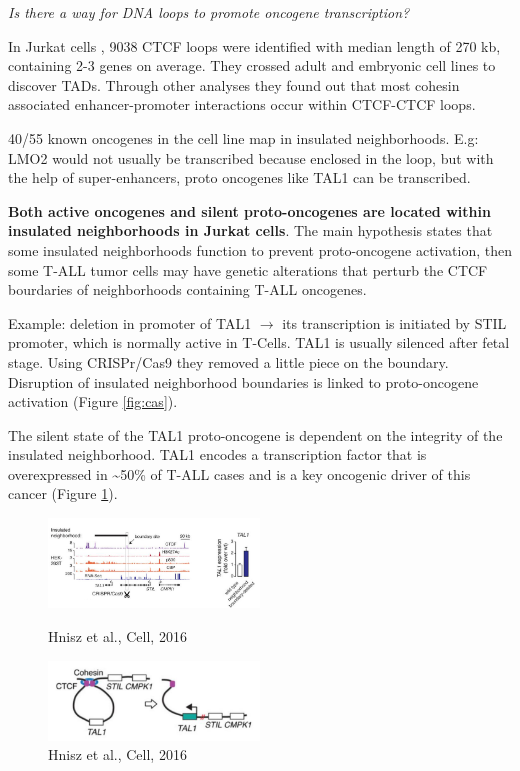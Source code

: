 \emph{Is there a way for DNA loops to promote oncogene transcription?}

In Jurkat cells , 9038 CTCF loops were identified with median length of 270 kb, containing 2-3 genes on average. They crossed adult and embryonic cell lines to discover TADs. Through other analyses they found out that most cohesin associated enhancer-promoter interactions occur within CTCF-CTCF loops.

40/55 known oncogenes in the cell line map in insulated neighborhoods. E.g: LMO2 would not usually be transcribed because enclosed in the loop, but with the help of super-enhancers, proto oncogenes like TAL1 can be transcribed.

\textbf{Both active oncogenes and silent proto-oncogenes are located within insulated neighborhoods in Jurkat cells}. 
The main hypothesis states that some insulated neighborhoods function to prevent proto-oncogene activation, then some T-ALL tumor cells may have genetic alterations that perturb the CTCF bourdaries of neighborhoods containing T-ALL oncogenes.

Example: deletion in promoter of TAL1 $\rightarrow$ its transcription is initiated by STIL promoter, which is normally active in T-Cells. TAL1 is usually silenced after fetal stage. Using CRISPr/Cas9 they removed a little piece on the boundary. Disruption of insulated neighborhood boundaries is linked to proto-oncogene activation (Figure \ref{fig:cas}).

The silent state of the TAL1 proto-oncogene is dependent on the integrity of the insulated neighborhood. TAL1 encodes a transcription factor that is overexpressed in \textasciitilde50\% of T-ALL cases and is a key oncogenic driver of this cancer (Figure \ref{fig:tal1}).

\begin{figure}[!htb]
   \begin{minipage}{0.48\textwidth}
     \centering
    \includegraphics[width=0.5\textwidth]{../_resources/bf32b9679af0fb7fcba57b9f87bb4207.png}
\caption{Hnisz et al., Cell, 2016}
\label{fig:cas}
   \end{minipage}\hfill
   \begin{minipage}{0.48\textwidth}
     \centering
    \includegraphics[width=0.5\textwidth]{../_resources/3d83d920d425aa5f76bdbb127596c02b.png}
\caption{Hnisz et al., Cell, 2016}\label{fig:tal1}
   \end{minipage}
\end{figure}

